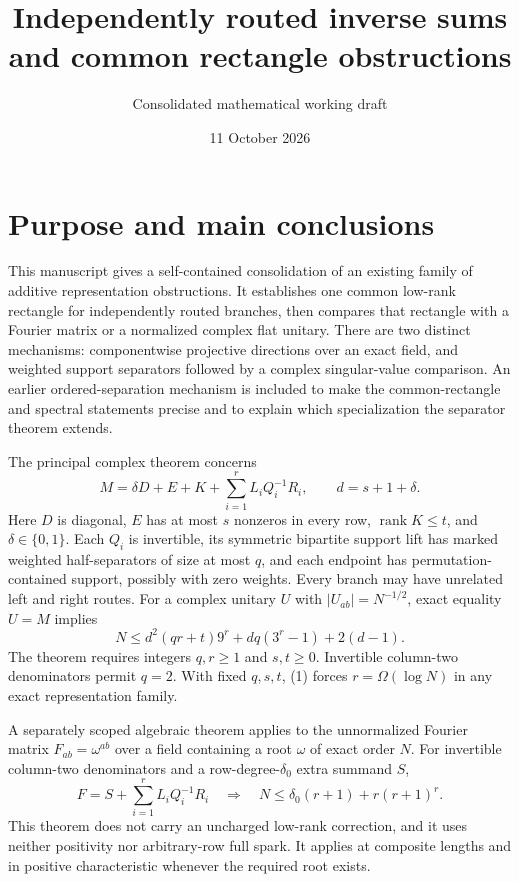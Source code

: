 \documentclass[
  11pt,
]{article}
\title{Independently routed inverse sums and common rectangle
obstructions}
\subtitle{Consolidated mathematical working draft}
\author{}
\date{11 October 2026}
\begin{document}
\maketitle

\section{Purpose and main
conclusions}\label{purpose-and-main-conclusions}

This manuscript gives a self-contained consolidation of an existing
family of additive representation obstructions. It establishes one
common low-rank rectangle for independently routed branches, then
compares that rectangle with a Fourier matrix or a normalized complex
flat unitary. There are two distinct mechanisms: componentwise
projective directions over an exact field, and weighted support
separators followed by a complex singular-value comparison. An earlier
ordered-separation mechanism is included to make the common-rectangle
and spectral statements precise and to explain which specialization the
separator theorem extends.

The principal complex theorem concerns \[
 M=\delta D+E+K+\sum_{i=1}^{r}L_iQ_i^{-1}R_i,\qquad d=s+1+\delta.
\] Here \(D\) is diagonal, \(E\) has at most \(s\) nonzeros in every
row, \(\operatorname{rank}K\le t\), and \(\delta\in\{0,1\}\). Each
\(Q_i\) is invertible, its symmetric bipartite support lift has marked
weighted half-separators of size at most \(q\), and each endpoint has
permutation-contained support, possibly with zero weights. Every branch
may have unrelated left and right routes. For a complex unitary \(U\)
with \(|U_{ab}|=N^{-1/2}\), exact equality \(U=M\) implies \[
 \boxed{N\le d^2(qr+t)9^r+dq(3^r-1)+2(d-1).}                 \tag{1}
\] The theorem requires integers \(q,r\ge1\) and \(s,t\ge0\). Invertible
column-two denominators permit \(q=2\). With fixed \(q,s,t\), (1) forces
\(r=\Omega(\log N)\) in any exact representation family.

A separately scoped algebraic theorem applies to the unnormalized
Fourier matrix \(F_{ab}=\omega^{ab}\) over a field containing a root
\(\omega\) of exact order \(N\). For invertible column-two denominators
and a row-degree-\(\delta_0\) extra summand \(S\), \[
 F=S+\sum_{i=1}^{r}L_iQ_i^{-1}R_i
 \quad\Longrightarrow\quad
 \boxed{N\le\delta_0(r+1)+r(r+1)^r.}                         \tag{2}
\] This theorem does not carry an uncharged low-rank correction, and it
uses neither positivity nor arbitrary-row full spark. It applies at
composite lengths and in positive characteristic whenever the required
root exists.
\end{document}
